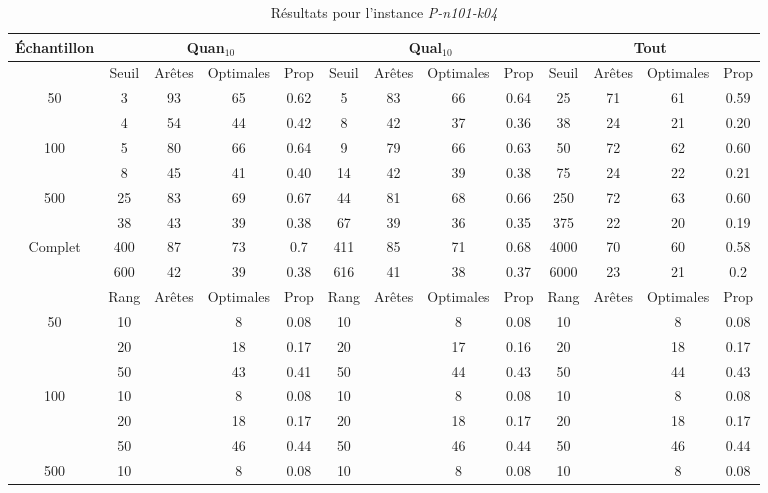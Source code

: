 \documentclass[a4paper,11pt]{article}%
\begin{document}
\begin{table}
\caption{Résultats pour l'instance \emph{P-n101-k04}}
\label{T3}
\begin{center}
\begin{tabular}{|@{}c@{}|@{}c@{}|@{}c@{}|@{}c@{}|@{}c@{}||@{}c@{}|@{}c@{}|@{}c@{}|@{}c@{}||@{}c@{}|@{}c@{}|@{}c@{}|@{}c@{}|}

\hline
 Échantillon & \multicolumn{4}{c|}{Quan$_{10}$} & \multicolumn{4}{c|}{Qual$_{10}$} & \multicolumn{4}{c|}{Tout} \\
 \hline
 & Seuil & Arêtes & Optimales & Prop & Seuil & Arêtes & Optimales & Prop & Seuil & Arêtes & Optimales & Prop \\
 \hline
 50 & 3 & 93 & 65 & 0.62 & 5 & 83 & 66 & 0.64 & 25 & 71 & 61 & 0.59 \\
 \cline{2-13} 
    & 4 & 54 & 44 & 0.42 & 8 & 42 & 37 & 0.36 & 38 & 24 & 21 & 0.20  \\
  \hline
   100 & 5 & 80 & 66 & 0.64 & 9 & 79 & 66 & 0.63 & 50 & 72 & 62 & 0.60 \\
 \cline{2-13} 
    & 8 & 45 & 41 & 0.40 & 14 & 42 & 39 & 0.38 & 75 & 24 & 22 & 0.21 \\
  \hline
   500 & 25 & 83 & 69 & 0.67 & 44 & 81 & 68 & 0.66 & 250 & 72 & 63 & 0.60 \\
 \cline{2-13} 
    & 38 & 43 & 39 & 0.38 & 67 & 39 & 36 & 0.35 & 375 & 22 & 20 & 0.19 \\
  \hline
   Complet & 400 & 87 & 73 & 0.7 & 411 & 85 & 71 & 0.68 & 4000 & 70 & 60 & 0.58 \\
 \cline{2-13} 
    & 600 & 42 & 39 & 0.38 & 616 & 41 & 38 & 0.37 & 6000 & 23 & 21 & 0.2 \\
  \hline
 & Rang& Arêtes & Optimales & Prop & Rang& Arêtes & Optimales & Prop & Rang& Arêtes & Optimales & Prop \\
 \hline
 50 & 10&  & 8 & 0.08 & 10&  & 8 & 0.08 & 10&  & 8 & 0.08 \\
 \cline{2-13} 
    & 20& & 18 & 0.17 & 20&  & 17 & 0.16 & 20& & 18 & 0.17  \\
 \cline{2-13} 
    & 50& & 43 & 0.41 & 50& & 44 & 0.43 & 50& & 44 & 0.43  \\
  \hline
   100 & 10&  & 8 & 0.08 & 10&  & 8 & 0.08 & 10&  & 8 & 0.08  \\
 \cline{2-13} 
    & 20& & 18 & 0.17 & 20& & 18 & 0.17 & 20& & 18 & 0.17  \\
  \cline{2-13} 
    & 50& & 46 & 0.44 & 50& & 46 & 0.44 & 50& & 46 & 0.44  \\
  \hline
   500 & 10&  & 8 & 0.08 & 10&  & 8 & 0.08 & 10&  & 8 & 0.08  \\

\end{tabular}
\end{center}
\end{table}
\end{document}
